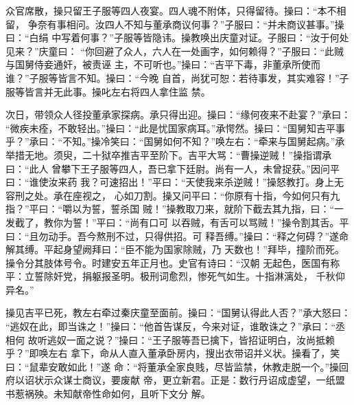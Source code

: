 众官席散，操只留王子服等四人夜宴。四人魂不附体，只得留待。操曰：“本不相留，
争奈有事相问。汝四人不知与董承商议何事？”子服曰：“并未商议甚事。”操曰：“白绢
中写着何事？”子服等皆隐讳。操教唤出庆童对证。子服曰：“汝于何处见来？”庆童曰：
“你回避了众人，六人在一处画字，如何赖得？”子服曰：“此贼与国舅侍妾通奸，被责诬
主，不可听也。”操曰：“吉平下毒，非董承所使而谁？”子服等皆言不知。操曰：“今晚
自首，尚犹可恕：若待事发，其实难容！”子服等皆言并无此事。操叱左右将四人拿住监
禁。

次日，带领众人径投董承家探病。承只得出迎。操曰：“缘何夜来不赴宴？”承曰：
“微疾未痊，不敢轻出。”操曰：“此是忧国家病耳。”承愕然。操曰：“国舅知吉平事
乎？”承曰：“不知。”操冷笑曰：“国舅如何不知？”唤左右：“牵来与国舅起病。”承
举措无地。须臾，二十狱卒推吉平至阶下。吉平大骂：“曹操逆贼！”操指谓承曰：“此人
曾攀下王子服等四人，吾已拿下廷尉。尚有一人，未曾捉获。”因问平曰：“谁使汝来药
我？可速招出！”平曰：“天使我来杀逆贼！”操怒教打。身上无容刑之处。承在座视之，
心如刀割。操又问平曰：“你原有十指，今如何只有九指？”平曰：“嚼以为誓，誓杀国
贼！”操教取刀来，就阶下截去其九指，曰：“一发截了，教你为誓！”平曰：“尚有口可
以吞贼，有舌可以骂贼！”操令割其舌。平曰：“且勿动手。吾今熬刑不过，只得供招。可
释吾缚。”操曰：“释之何碍？”遂命解其缚。平起身望阙拜曰：“臣不能为国家除贼，乃
天数也！”拜毕，撞阶而死。操令分其肢体号令。时建安五年正月也。史官有诗曰：“汉朝
无起色，医国有称平：立誓除奸党，捐躯报圣明。极刑词愈烈，惨死气如生。十指淋漓处，
千秋仰异名。”

操见吉平已死，教左右牵过秦庆童至面前。操曰：“国舅认得此人否？”承大怒曰：
“逃奴在此，即当诛之！”操曰：“他首告谋反，今来对证，谁敢诛之？”承曰：“丞相何
故听逃奴一面之说？”操曰：“王子服等吾已擒下，皆招证明白，汝尚抵赖乎？”即唤左右
拿下，命从人直入董承卧房内，搜出衣带诏并义状。操看了，笑曰：“鼠辈安敢如此！”遂
命：“将董承全家良贱，尽皆监禁，休教走脱一个。”操回府以诏状示众谋士商议，要废献
帝，更立新君。正是：数行丹诏成虚望，一纸盟书惹祸殃。未知献帝性命如何，且听下文分
解。
